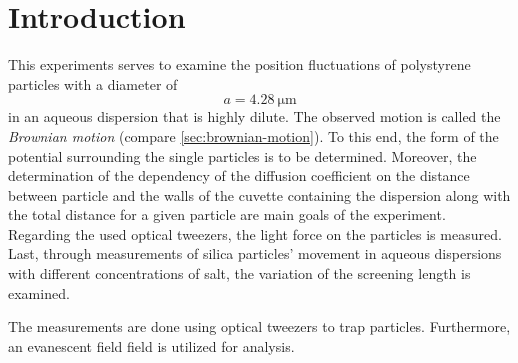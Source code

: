 \documentclass[../bericht.tex]{subfiles}
\begin{document}
  \chapter{Introduction}

    This experiments serves to examine the position fluctuations of polystyrene particles with a diameter of
    \begin{equation*}
      a=\SI{4,28}{\micro\meter}
    \end{equation*}
    in an aqueous dispersion that is highly dilute. The observed motion is called the \textit{Brownian motion} (compare \cref{sec:brownian-motion}). To this end, the form of the potential surrounding the single particles is to be determined. Moreover, the determination of the dependency of the diffusion coefficient on the distance between particle and the walls of the cuvette containing the dispersion along with the total distance for a given particle are main goals of the experiment. Regarding the used optical tweezers, the light force on the particles is measured. Last, through measurements of silica particles' movement in aqueous dispersions with different concentrations of salt, the variation of the screening length is examined.

    The measurements are done using optical tweezers to trap particles. Furthermore, an evanescent field field is utilized for analysis.
\end{document}
